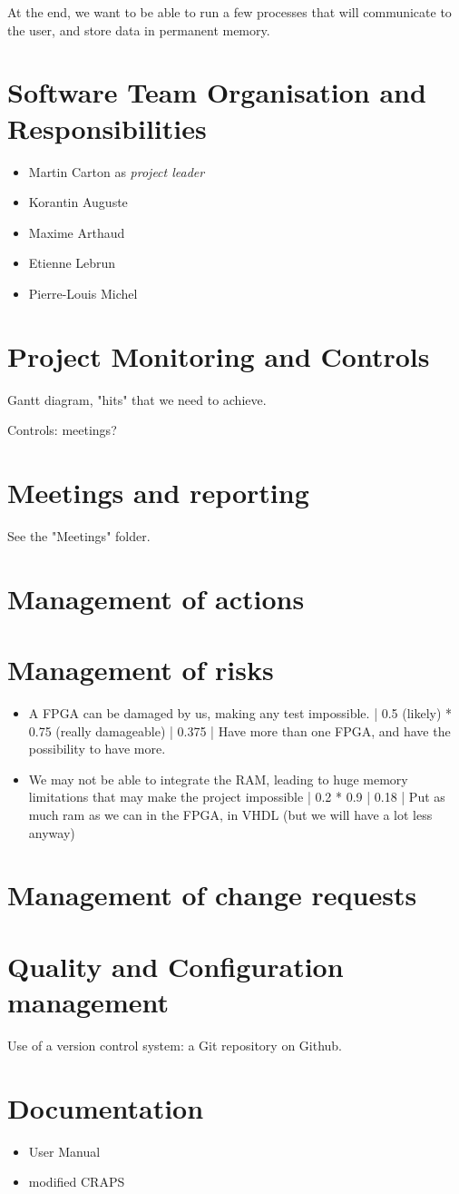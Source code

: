\documentclass{article}
\begin{document}
    At the end, we want to be able to run a few processes that will communicate
    to the user, and store data in permanent memory.

  \section{Software Team Organisation and Responsibilities}
    \begin{itemize}
      \item Martin Carton as \textit{project leader}
      \item Korantin Auguste
      \item Maxime Arthaud
      \item Etienne Lebrun
      \item Pierre-Louis Michel
    \end{itemize}

  \section{Project Monitoring and Controls}
    Gantt diagram, "hits" that we need to achieve.

    Controls: meetings?

  \section{Meetings and reporting}
    See the "Meetings" folder.

  \section{Management of actions}

  \section{Management of risks}
    \begin{itemize}
      \item A FPGA can be damaged by us, making any test impossible. | 0.5
        (likely) * 0.75 (really damageable) | 0.375 | Have more than one FPGA,
        and have the possibility to have more.
      \item We may not be able to integrate the RAM, leading to huge memory
        limitations that may make the project impossible | 0.2 * 0.9 | 0.18 |
        Put as much ram as we can in the FPGA, in VHDL (but we will have a lot
        less anyway)
    \end{itemize}

  \section{Management of change requests}

  \section{Quality and Configuration management}
    Use of a version control system: a Git repository on Github.

  \section{Documentation}
    \begin{itemize}
      \item User Manual
      \item modified CRAPS
    \end{itemize}
\end{document}

